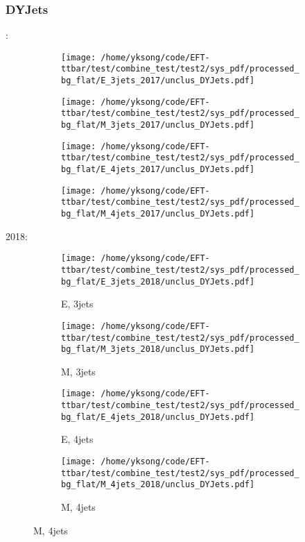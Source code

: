 \documentclass{beamer}
\begin{document}
\begin{frame}
\frametitle{DYJets}
\fontsize{5}{1}:
\begin{figure}
\centering
\begin{subfigure}[b]{0.24\textwidth}
\texttt{[image: /home/yksong/code/EFT-ttbar/test/combine\_test/test2/sys\_pdf/processed\_bg\_flat/E\_3jets\_2017/unclus\_DYJets.pdf]}
\end{subfigure}
\begin{subfigure}[b]{0.24\textwidth}
\texttt{[image: /home/yksong/code/EFT-ttbar/test/combine\_test/test2/sys\_pdf/processed\_bg\_flat/M\_3jets\_2017/unclus\_DYJets.pdf]}
\end{subfigure}
\begin{subfigure}[b]{0.24\textwidth}
\texttt{[image: /home/yksong/code/EFT-ttbar/test/combine\_test/test2/sys\_pdf/processed\_bg\_flat/E\_4jets\_2017/unclus\_DYJets.pdf]}
\end{subfigure}
\begin{subfigure}[b]{0.24\textwidth}
\texttt{[image: /home/yksong/code/EFT-ttbar/test/combine\_test/test2/sys\_pdf/processed\_bg\_flat/M\_4jets\_2017/unclus\_DYJets.pdf]}
\end{subfigure}
\end{figure}
2018:
\begin{figure}
\centering
\begin{subfigure}[b]{0.24\textwidth}
\texttt{[image: /home/yksong/code/EFT-ttbar/test/combine\_test/test2/sys\_pdf/processed\_bg\_flat/E\_3jets\_2018/unclus\_DYJets.pdf]}
\captionsetup{font=tiny}
\caption{E, 3jets}
\end{subfigure}
\begin{subfigure}[b]{0.24\textwidth}
\texttt{[image: /home/yksong/code/EFT-ttbar/test/combine\_test/test2/sys\_pdf/processed\_bg\_flat/M\_3jets\_2018/unclus\_DYJets.pdf]}
\captionsetup{font=tiny}
\caption{M, 3jets}
\end{subfigure}
\begin{subfigure}[b]{0.24\textwidth}
\texttt{[image: /home/yksong/code/EFT-ttbar/test/combine\_test/test2/sys\_pdf/processed\_bg\_flat/E\_4jets\_2018/unclus\_DYJets.pdf]}
\captionsetup{font=tiny}
\caption{E, 4jets}
\end{subfigure}
\begin{subfigure}[b]{0.24\textwidth}
\texttt{[image: /home/yksong/code/EFT-ttbar/test/combine\_test/test2/sys\_pdf/processed\_bg\_flat/M\_4jets\_2018/unclus\_DYJets.pdf]}
\captionsetup{font=tiny}
\caption{M, 4jets}
\end{subfigure}
\end{figure}
\end{frame}
\end{document}
